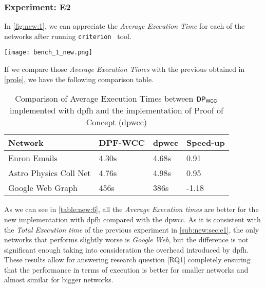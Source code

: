 \subsubsection{Experiment: E2}\label{sub:new:exp:2}
In \autoref{fig:new:1}, we can appreciate the \textit{Average Execution Time} for each of the networks after running \texttt{criterion}~\cite{criterion} tool.

\begin{minipage}[t]{\linewidth}
  \texttt{[image: bench\_1\_new.png]}
  \captionsetup{type=figure}
  \label{fig:new:1}
\end{minipage}

If we compare those \textit{Average Execution Times} with the previous obtained in \autoref{prole}, we have the following comparison table.

 \begin{table}[H]
  \centering
  \begin{tabular}{|l|l|l|l|}
   \hline
   \textbf{Network} & \textbf{DPF-WCC} & \textbf{\acrshort{dpwcc}} & \textbf{Speed-up}\\
   \hline
   Enron Emails & 4.30s & 4.68s &  0.91\\
   \hline
   Astro Physics Coll Net & 4.76s  & 4.98s & 0.95\\
   \hline
   Google Web Graph & 456s & 386s & -1.18\\
   \hline
  \end{tabular}
 \caption{Comparison of Average Execution Times between $\mathsf{DP_{WCC}}$ implemented with \acrshort{dpfh} and the implementation of Proof of Concept (\acrshort{dpwcc})}
 \label{table:new:6}
 \end{table}

As we can see in \autoref{table:new:6}, all the \textit{Average Execution times} are better for the new implementation with \acrshort{dpfh} compared with the \acrshort{dpwcc}.
As it is consistent with the \textit{Total Execution time} of the previous experiment in \autoref{sub:new:sec:e1}, the only networks that performs slightly worse is \textit{Google Web}, but the difference is not significant enough taking into consideration the overhead introduced by \acrshort{dpfh}.
These results allow for answering research question [RQ1] completely ensuring that the performance in terms of execution is better for smaller networks and almost similar for bigger networks. 

